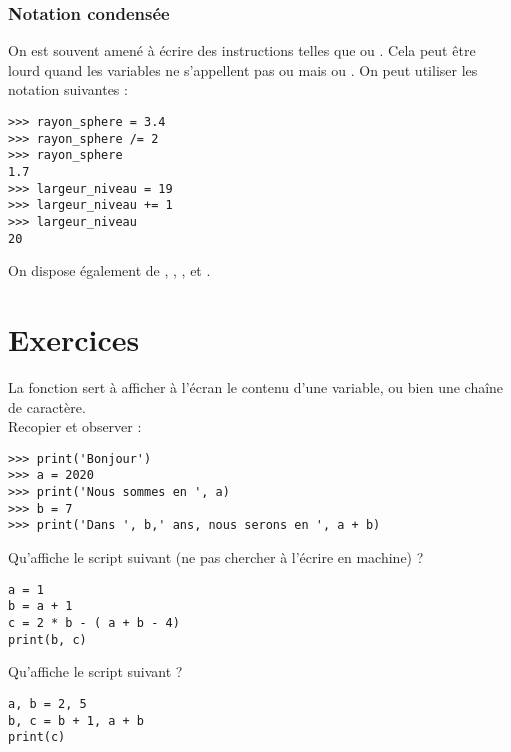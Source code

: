 \subsubsection*{Notation condensée}
On est souvent amené à écrire des instructions telles que   ou . Cela peut être lourd quand les variables ne s'appellent
pas  ou  mais  ou . On peut utiliser les notation suivantes :
\begin{pys}\begin{verbatim}
>>> rayon_sphere = 3.4
>>> rayon_sphere /= 2
>>> rayon_sphere
1.7
>>> largeur_niveau = 19
>>> largeur_niveau += 1
>>> largeur_niveau
20
\end{verbatim}
\end{pys}

On dispose également de \pythoninline{*=}, \pythoninline{//=}, \pythoninline{\%=}, \pythoninline{-=} et \pythoninline{**=}.
\section{Exercices}

\begin{exercice}

    La fonction  sert à afficher à l'écran le contenu d'une variable, ou bien une chaîne de caractère.\\
    Recopier et observer :
\begin{verbatim}
>>> print('Bonjour')
>>> a = 2020
>>> print('Nous sommes en ', a)
>>> b = 7
>>> print('Dans ', b,' ans, nous serons en ', a + b)
\end{verbatim}
\end{exercice}

\begin{exercice}[ : affectations 1]

    Qu'affiche le script suivant (ne pas chercher à l'écrire en machine) ?
\begin{verbatim}
a = 1
b = a + 1
c = 2 * b - ( a + b - 4)
print(b, c)
\end{verbatim}
\end{exercice}

\begin{exercice}[ : affectations 2]
    Qu'affiche le script suivant ?
    
    \begin{verbatim}
a, b = 2, 5
b, c = b + 1, a + b
print(c)
    \end{verbatim}
    \end{exercice}

